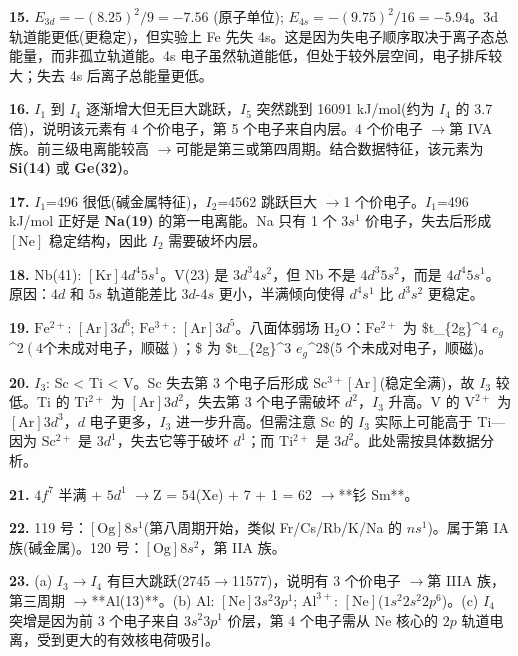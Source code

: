 \documentclass[a4paper,11pt]{ctexart}
\newcommand{\箭}{\ensuremath{\rightarrow}}
\newcommand{\左箭}{\ensuremath{\leftarrow}}
\newcommand{\上箭}{\ensuremath{\uparrow}}
\newcommand{\下箭}{\ensuremath{\downarrow}}
\newcommand{\衡}{\ensuremath{\rightleftharpoons}}
\newcommand{\双箭}{\ensuremath{\leftrightarrow}}
\newcommand{\约等于}{\ensuremath{\approx}}
\newcommand{\小于等于}{\ensuremath{\leq}}
\newcommand{\大于等于}{\ensuremath{\geq}}
\newcommand{\不等于}{\ensuremath{\neq}}
\newcommand{\西格马}{\ensuremath{\sigma}}
\newcommand{\派}{\ensuremath{\pi}}
\begin{document}
\textbf{15.} \(E_{3d} = -(8.25)^2/9 = -7.56\) (原子单位); \(E_{4s} = -(9.75)^2/16 = -5.94\)。3d 轨道能更低(更稳定)，但实验上 Fe 先失 4s。这是因为失电子顺序取决于离子态总能量，而非孤立轨道能。4s 电子虽然轨道能低，但处于较外层空间，电子排斥较大；失去 4s 后离子总能量更低。

\textbf{16.} \(I_1\) 到 \(I_4\) 逐渐增大但无巨大跳跃，\(I_5\) 突然跳到 16091 kJ/mol(约为 \(I_4\) 的 3.7 倍)，说明该元素有 4 个价电子，第 5 个电子来自内层。4 个价电子 \箭 第 IVA 族。前三级电离能较高 \箭 可能是第三或第四周期。结合数据特征，该元素为 \textbf{Si(14)} 或 \textbf{Ge(32)}。

\textbf{17.} \(I_1\)=496 很低(碱金属特征)，\(I_2\)=4562 跳跃巨大 \箭 1 个价电子。\(I_1\)=496 kJ/mol 正好是 \textbf{Na(19)} 的第一电离能。Na 只有 1 个 \(3s^1\) 价电子，失去后形成 \([\mathrm{Ne}]\) 稳定结构，因此 \(I_2\) 需要破坏内层。

\textbf{18.} Nb(41): \([\mathrm{Kr}]4d^4 5s^1\)。V(23) 是 \(3d^3 4s^2\)，但 Nb 不是 \(4d^3 5s^2\)，而是 \(4d^4 5s^1\)。原因：\(4d\) 和 \(5s\) 轨道能差比 \(3d\)-\(4s\) 更小，半满倾向使得 \(d^4 s^1\) 比 \(d^3 s^2\) 更稳定。

\textbf{19.} \(\mathrm{Fe^{2+}}\): \([\mathrm{Ar}]3d^6\); \(\mathrm{Fe^{3+}}\): \([\mathrm{Ar}]3d^5\)。八面体弱场 \(\mathrm{H_2O}\)：\(\mathrm{Fe^{2+}}\) 为 \$t\_\{2g\}\^{}4 \(e_g\)\^{}2\((4 个未成对电子，顺磁)；\)\$ 为 \$t\_\{2g\}\^{}3 \(e_g\)\^{}2\$(5 个未成对电子，顺磁)。

\textbf{20.} \(I_3\): Sc \textless{} Ti \textless{} V。Sc 失去第 3 个电子后形成 \(\mathrm{Sc^{3+}} [\mathrm{Ar}]\)(稳定全满)，故 \(I_3\) 较低。Ti 的 \(\mathrm{Ti^{2+}}\) 为 \([\mathrm{Ar}]3d^2\)，失去第 3 个电子需破坏 \(d^2\)，\(I_3\) 升高。V 的 \(\mathrm{V^{2+}}\) 为 \([\mathrm{Ar}]3d^3\)，\(d\) 电子更多，\(I_3\) 进一步升高。但需注意 Sc 的 \(I_3\) 实际上可能高于 Ti---因为 \(\mathrm{Sc^{2+}}\) 是 \(3d^1\)，失去它等于破坏 \(d^1\)；而 \(\mathrm{Ti^{2+}}\) 是 \(3d^2\)。此处需按具体数据分析。

\textbf{21.} \(4f^7\) 半满 + \(5d^1\) \箭 Z = 54(Xe) + 7 + 1 = 62 \箭 **钐 Sm**。

\textbf{22.} 119 号：\([\mathrm{Og}]8s^1\)(第八周期开始，类似 Fr/Cs/Rb/K/Na 的 \(ns^1\))。属于第 IA 族(碱金属)。120 号：\([\mathrm{Og}]8s^2\)，第 IIA 族。

\textbf{23.} (a) \(I_3\)\箭\(I_4\) 有巨大跳跃(2745\箭11577)，说明有 3 个价电子 \箭 第 IIIA 族，第三周期 \箭 **Al(13)**。(b) Al: \([\mathrm{Ne}]3s^2 3p^1\); \(\mathrm{Al^{3+}}\): \([\mathrm{Ne}]\)(\(1s^2 2s^2 2p^6\))。(c) \(I_4\) 突增是因为前 3 个电子来自 \(3s^2 3p^1\) 价层，第 4 个电子需从 \(\mathrm{Ne}\) 核心的 \(2p\) 轨道电离，受到更大的有效核电荷吸引。
\end{document}
